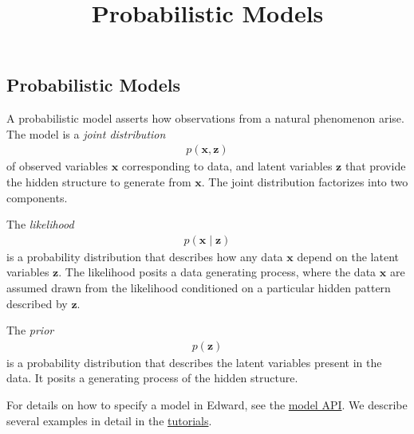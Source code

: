 \title{Probabilistic Models}

\subsection{Probabilistic Models}

A probabilistic model asserts how observations from a natural phenomenon arise.
The model is a \emph{joint distribution}
\begin{align*}
  p(\mathbf{x}, \mathbf{z})
\end{align*}
of observed variables $\mathbf{x}$ corresponding to data, and latent
variables $\mathbf{z}$ that provide the hidden structure to generate
from $\mathbf{x}$. The joint distribution factorizes into two
components.

The \emph{likelihood}
\begin{align*}
  p(\mathbf{x} \mid \mathbf{z})
\end{align*}
is a probability distribution that describes how any data $\mathbf{x}$
depend on the latent variables $\mathbf{z}$. The likelihood posits a
data generating process, where the data $\mathbf{x}$ are assumed drawn
from the likelihood conditioned on a particular hidden pattern
described by $\mathbf{z}$.

The \emph{prior}
\begin{align*}
  p(\mathbf{z})
\end{align*}
is a probability distribution that describes the latent variables
present in the data. It posits a generating process of the hidden structure.

For details on how to specify a model in Edward, see the
\href{/api/ed/models}{model API}. We describe several examples in detail
in the \href{/tutorials/}{tutorials}.

